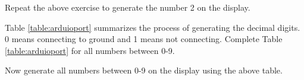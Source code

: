 \begin{problem}
	Repeat the above exercise to generate the number 2 on the display.
\end{problem}	
%
\renewcommand{\thetable}{\theproblem}
\begin{problem}
Table \ref{table:arduioport} summarizes the process of generating the decimal digits.  0 means connecting to ground and 1 means not connecting.  	Complete Table \ref{table:arduioport} for all numbers between 0-9.
\end{problem}	

%
%
\begin{problem}
	Now generate all numbers between  0-9 on the display using the above table.
\end{problem}
